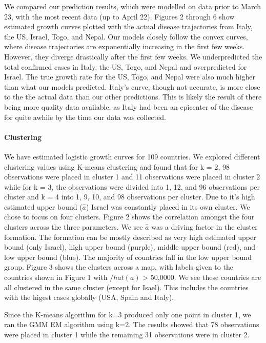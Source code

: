 \documentclass[]{article}
\let\oldparagraph\paragraph
\renewcommand{\paragraph}[1]{\oldparagraph{#1}\mbox{}}
\begin{document}
We compared our prediction results, which were modelled on data prior to
March 23, with the most recent data (up to April 22). Figures 2 through
6 show estimated growth curves plotted with the actual disease
trajectories from Italy, the US, Israel, Togo, and Nepal. Our models
closely follow the convex curves, where disease trajectories are
exponentially increasing in the first few weeks. However, they diverge
drastically after the first few weeks. We underpredicted the total
confirmed cases in Italy, the US, Togo, and Nepal and overpredicted for
Israel. The true growth rate for the US, Togo, and Nepal were also much
higher than what our models predicted. Italy's curve, though not
accurate, is more close to the the actual data than our other
predictions. This is likely the result of there being more quality data
available, as Italy had been an epicenter of the disease for quite
awhile by the time our data was collected.

\hypertarget{clustering}{%
\paragraph{Clustering}\label{clustering}}

We have estimated logistic growth curves for 109 countries. We explored
different clustering values using K-means clustering and found that for
k = 2, 98 observations were placed in cluster 1 and 11 observations were
placed in cluster 2 while for k = 3, the observations were divided into
1, 12, and 96 observations per cluster and k = 4 into 1, 9, 10, and 98
observations per cluster. Due to it's high estimated upper bound
(\(\hat{a}\)) Israel was constantly placed in its own cluster. We chose
to focus on four clusters. Figure 2 shows the correlation amongst the
four clusters across the three parameters. We see \(\hat{a}\) was a
driving factor in the cluster formation. The formation can be mostly
described as very high estimated upper bound (only Israel), high upper
bound (purple), middle upper bound (red), and low upper bound (blue).
The majority of countries fall in the low upper bound group. Figure 3
shows the clusters across a map, with labels given to the countries
shown in Figure 1 with \(/hat(a)\) \textgreater{} 50,0000. We see these
countries are all clustered in the same cluster (except for Isael). This
includes the countries with the higest cases globally (USA, Spain and
Italy).

Since the K-means algorithm for k=3 produced only one point in cluster
1, we ran the GMM EM algorithm using k=2. The results showed that 78
observations were placed in cluster 1 while the remaining 31
observations were in cluster 2.
\end{document}
